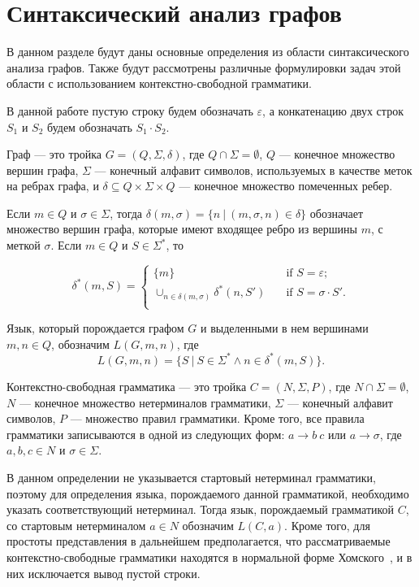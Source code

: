 \section{Синтаксический анализ графов}
В данном разделе будут даны основные определения из области синтаксического анализа графов. Также будут рассмотрены различные формулировки задач этой области с использованием контекстно-свободной грамматики.

В данной работе пустую строку будем обозначать $\varepsilon$, а конкатенацию двух строк $S_{1}$ и $S_{2}$ будем обозначать $S_{1} \cdot S_{2}$.

\begin{mydef}
Граф --- это тройка $G = (Q,\Sigma,\delta)$, где $Q \cap \Sigma =  \emptyset$, $Q$ --- конечное множество вершин графа, $\Sigma$ --- конечный алфавит символов, используемых в качестве меток на ребрах графа, и $\delta \subseteq Q \times \Sigma \times Q$ --- конечное множество помеченных ребер.
\end{mydef}
Если $m \in Q$ и $\sigma \in \Sigma$, тогда $\delta(m,\sigma) = \{n~|~(m, \sigma, n) \in \delta\}$ обозначает множество вершин графа, которые имеют входящее ребро из вершины $m$, с меткой $\sigma$. Если $m \in Q$ и $S \in \Sigma^*$, то


\[ \delta^*(m, S) =
  \begin{cases}
    \{m\}       & \quad \text{if } S = \varepsilon ;\\
    \cup_{n \in \delta(m, \sigma)} \delta^*(n, S')  & \quad \text{if } S = \sigma \cdot S'.\\
  \end{cases}
\]

Язык, который порождается графом $G$ и выделенными в нем вершинами $m, n \in Q$, обозначим $L(G, m, n)$, где
\[ L(G, m, n) = \{S~|~S \in \Sigma^* \wedge n \in \delta^*(m, S)\}.
\]

\begin{mydef}
Контекстно-свободная грамматика --- это тройка $C = (N,\Sigma,P)$, где $N \cap \Sigma =  \emptyset$, $N$ --- конечное множество нетерминалов грамматики, $\Sigma$ --- конечный алфавит символов, $P$ --- множество правил грамматики. Кроме того, все правила грамматики записываются в одной из следующих форм: $a \rightarrow b~c$ или $a \rightarrow \sigma$, где $a,b,c \in N$ и $\sigma \in \Sigma$.
\end{mydef}

В данном определении не указывается стартовый нетерминал грамматики, поэтому для определения языка, порождаемого данной грамматикой, необходимо указать соответствующий нетерминал. Тогда язык, порождаемый грамматикой $C$, со стартовым нетерминалом $a \in N$ обозначим $L(C,a)$. Кроме того, для простоты представления в дальнейшем предполагается, что рассматриваемые контекстно-свободные грамматики находятся в нормальной форме Хомского~\cite{azimov-spbu-binChomsk}, и в них исключается вывод пустой строки.

